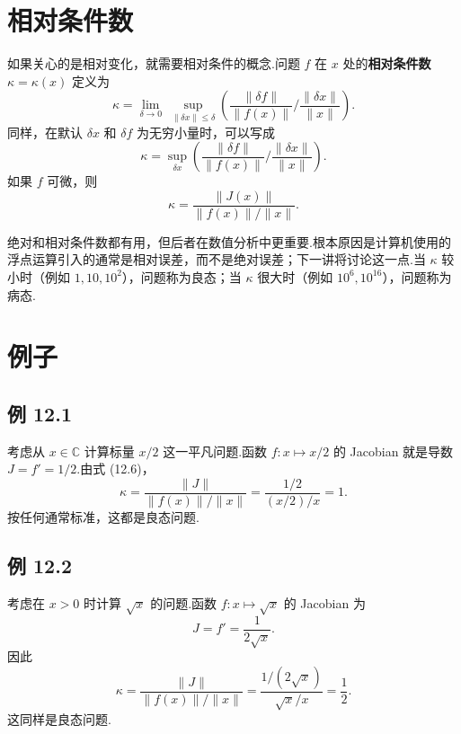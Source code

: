 \documentclass[UTF8,fontset=none,12pt]{ctexart}
\newcommand{\C}{\mathbb{C}}
\theoremstyle{definition}
\begin{document}
\section*{相对条件数}

如果关心的是相对变化，就需要相对条件的概念.问题 $f$ 在 $x$ 处的\textbf{相对条件数} $\kappa=\kappa(x)$ 定义为
\begin{equation}
    \kappa
    =\lim_{\delta\to0}\ 
    \sup_{\|\delta x\|\le\delta}
    \left(
    \frac{\|\delta f\|}{\|f(x)\|}
    \bigg/
    \frac{\|\delta x\|}{\|x\|}
    \right).
    \tag{12.4}
\end{equation}
同样，在默认 $\delta x$ 和 $\delta f$ 为无穷小量时，可以写成
\begin{equation}
    \kappa
    =\sup_{\delta x}
    \left(
    \frac{\|\delta f\|}{\|f(x)\|}
    \bigg/
    \frac{\|\delta x\|}{\|x\|}
    \right).
    \tag{12.5}
\end{equation}
如果 $f$ 可微，则
\begin{equation}
    \kappa=\frac{\|J(x)\|}{\|f(x)\|/\|x\|}.
    \tag{12.6}
\end{equation}

绝对和相对条件数都有用，但后者在数值分析中更重要.根本原因是计算机使用的浮点运算引入的通常是相对误差，而不是绝对误差；下一讲将讨论这一点.当 $\kappa$ 较小时（例如 $1,10,10^2$），问题称为良态；当 $\kappa$ 很大时（例如 $10^6,10^{16}$），问题称为病态.

\section*{例子}

\subsection*{例 12.1}

考虑从 $x\in\C$ 计算标量 $x/2$ 这一平凡问题.函数 $f:x\mapsto x/2$ 的 Jacobian 就是导数 $J=f'=1/2$.由式 (12.6)，
\[
    \kappa
    =\frac{\|J\|}{\|f(x)\|/\|x\|}
    =\frac{1/2}{(x/2)/x}
    =1.
\]
按任何通常标准，这都是良态问题.

\subsection*{例 12.2}

考虑在 $x>0$ 时计算 $\sqrt{x}$ 的问题.函数 $f:x\mapsto\sqrt{x}$ 的 Jacobian 为
\[
    J=f'=\frac{1}{2\sqrt{x}}.
\]
因此
\[
    \kappa
    =\frac{\|J\|}{\|f(x)\|/\|x\|}
    =\frac{1/(2\sqrt{x})}{\sqrt{x}/x}
    =\frac12.
\]
这同样是良态问题.
\end{document}
